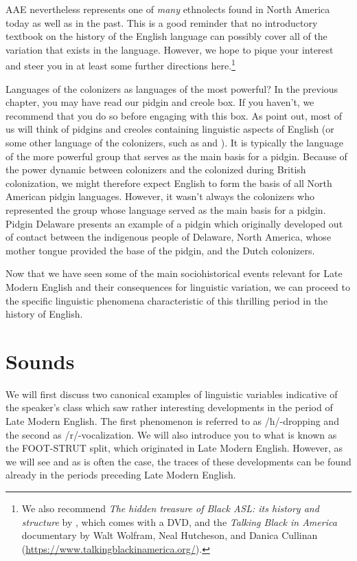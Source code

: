 AAE nevertheless represents one of \textit{many} ethnolects found in North America today as well as in the past. This is a good reminder that no introductory textbook on the history of the English language can possibly cover all of the variation that exists in the language. However, we hope to pique your interest and steer you in at least some further directions here.\footnote{We also recommend \textit{The hidden treasure of Black ASL: its history and structure} by \citet{McCaskilletal2011}, which comes with a DVD, and the \textit{Talking Black in America} documentary by Walt Wolfram, Neal Hutcheson, and Danica Cullinan (\url{https://www.talkingblackinamerica.org/}).}


\begin{varietybox}{Languages of the colonizers as languages of the most powerful?}
In the previous chapter, you may have read our pidgin and creole box. If you haven't, we recommend that you do so before engaging with this box. As \citet{SmithKim2019} point out, most of us will think of pidgins and creoles containing linguistic aspects of English (or some other language of the colonizers, such as  and ). It is typically the language of the more powerful group that serves as the main basis for a pidgin. Because of the power dynamic between colonizers and the colonized during British colonization, we might therefore expect English to form the basis of all North American pidgin languages. However, it wasn't always the colonizers who represented the group whose language served as the main basis for a pidgin. Pidgin Delaware presents an example of a pidgin which originally developed out of contact between the indigenous people of Delaware, North America, whose mother tongue provided the base of the pidgin, and the Dutch colonizers.
\end{varietybox}


\noindent Now that we have seen some of the main sociohistorical events relevant for Late Modern English and their consequences for linguistic variation, we can proceed to the specific linguistic phenomena characteristic of this thrilling period in the history of English.

\largerpage
\section{Sounds}
We will first discuss two canonical examples of linguistic variables indicative of the speaker's class which saw rather interesting developments in the period of Late Modern English. The first phenomenon is referred to as /h/-dropping and the second as /r/-vocalization. We will also introduce you to what is known as the FOOT-STRUT split, which originated in Late Modern English. However, as we will see and as is often the case, the traces of these developments can be found already in the periods preceding Late Modern English. 

